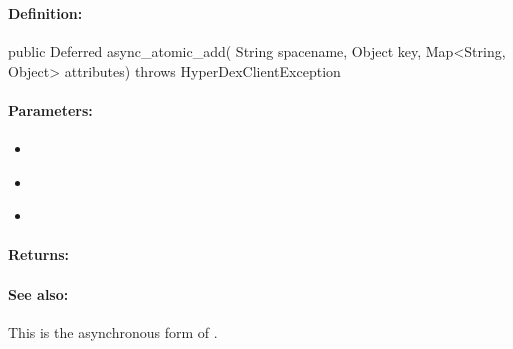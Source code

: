 \pagebreak
\subsubsection{}
\label{api:java:async_atomic_add}


\paragraph{Definition:}
\begin{javacode}
public Deferred async_atomic_add(
        String spacename,
        Object key,
        Map<String, Object> attributes) throws HyperDexClientException
\end{javacode}

\paragraph{Parameters:}
\begin{itemize}[noitemsep]
\item {}\\

\item {}\\

\item {}\\

\end{itemize}

\paragraph{Returns:}


\paragraph{See also:}  This is the asynchronous form of .

\pagebreak
\subsubsection{}
\label{api:java:cond_atomic_add}


